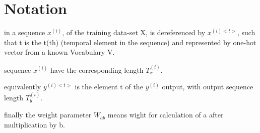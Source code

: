 \documentclass[4apaper,12pt]{book}
\begin{document}
  \section{Notation}
  \begin{description}
  \item in a sequence $x^{(i)}$, of the training data-set X, is dereferenced by $x^{(i)<t>}$, such that t is the t(th)  (temporal element in the sequence) and represented by one-hot vector from a known Vocabulary V.
  \item sequence $x^{(i)}$ have the corresponding length $T_x^{(i)}$.
  \item equivalently $y^{(i)<t>}$ is the element t of the $y^{(i)}$ output, with output sequence length $T_y^{(i)}$.
    \item finally the weight parameter $W_{ab}$ means wight for calculation of a  after multiplication by b.
  \end{description}
\end{document}
